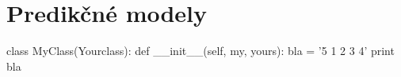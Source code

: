\documentclass[main.tex]{subfiles}
\begin{document}
	
\section{Predikčné modely}	
	
\begin{python}
class MyClass(Yourclass):
	def __init__(self, my, yours):
		bla = '5 1 2 3 4'
		print bla
\end{python}
	
\end{document}
